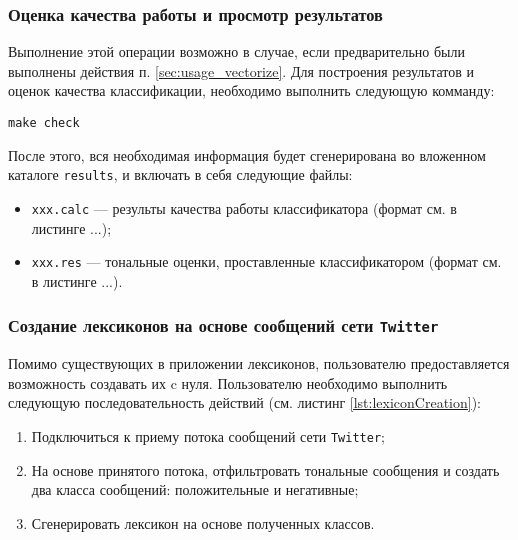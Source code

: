         \subsubsection{Оценка качества работы и просмотр результатов}
        Выполнение этой операции возможно в случае, если предварительно были
        выполнены действия п. \ref{sec:usage_vectorize}.
        Для построения результатов и оценок качества классификации, необходимо
        выполнить следующую комманду:
        \begin{center}
            {\tt make check}
        \end{center}

        После этого, вся необходимая информация будет сгенерирована во вложенном
        каталоге {\tt results}, и включать в себя следующие файлы:
        \begin{itemize}
            \item {\tt xxx.calc} --- результы качества работы классификатора
            (формат см. в листинге ...);
            \item {\tt xxx.res} --- тональные оценки, проставленные
            классификатором (формат см. в листинге ...).
        \end{itemize}

        \subsubsection{Создание лексиконов на основе сообщений сети
            {\tt Twitter} }
        Помимо существующих в приложении лексиконов, пользователю предоставляется
        возможность создавать их c нуля. Пользователю необходимо выполнить следующую
        последовательность действий (см. листинг \ref{lst:lexiconCreation}):
        \begin{enumerate}
            \item Подключиться к приему потока сообщений сети {\tt Twitter};
            \item На основе принятого потока, отфильтровать тональные сообщения
            и создать два класса сообщений: положительные и негативные;
            \item Сгенерировать лексикон на основе полученных классов.
        \end{enumerate}

        \lstset{style=bash}
        
